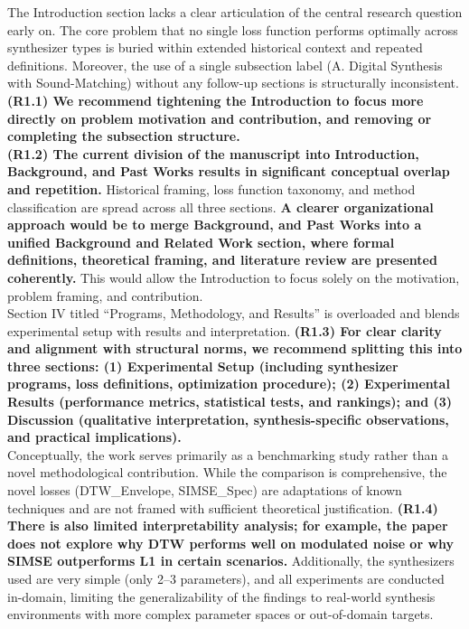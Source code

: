 \documentclass[11pt]{article}
\begin{document}
\noindent
The Introduction section lacks a clear articulation of the central research question early on. The core problem that no single loss function performs optimally across synthesizer types is buried within extended historical context and repeated definitions. Moreover, the use of a single subsection label (A. Digital Synthesis with Sound-Matching) without any follow-up sections is structurally inconsistent. \textbf{(R1.1) We recommend tightening the Introduction to focus more directly on problem motivation and contribution, and removing or completing the subsection structure.} \\
\textbf{(R1.2) The current division of the manuscript into Introduction, Background, and Past Works results in significant conceptual overlap and repetition.} Historical framing, loss function taxonomy, and method classification are spread across all three sections. \textbf{A clearer organizational approach would be to merge Background, and Past Works into a unified Background and Related Work section, where formal definitions, theoretical framing, and literature review are presented coherently.} This would allow the Introduction to focus solely on the motivation, problem framing, and contribution. \\
Section IV titled ``Programs, Methodology, and Results'' is overloaded and blends experimental setup with results and interpretation. \textbf{(R1.3) For clear clarity and alignment with structural norms, we recommend splitting this into three sections: (1) Experimental Setup (including synthesizer programs, loss definitions, optimization procedure); (2) Experimental Results (performance metrics, statistical tests, and rankings); and (3) Discussion (qualitative interpretation, synthesis-specific observations, and practical implications).} \\
Conceptually, the work serves primarily as a benchmarking study rather than a novel methodological contribution. While the comparison is comprehensive, the novel losses (DTW\_Envelope, SIMSE\_Spec) are adaptations of known techniques and are not framed with sufficient theoretical justification. \textbf{(R1.4) There is also limited interpretability analysis; for example, the paper does not explore why DTW performs well on modulated noise or why SIMSE outperforms L1 in certain scenarios.} Additionally, the synthesizers used are very simple (only 2--3 parameters), and all experiments are conducted in-domain, limiting the generalizability of the findings to real-world synthesis environments with more complex parameter spaces or out-of-domain targets. \\
\end{document}
